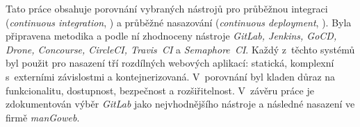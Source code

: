 Tato práce obsahuje porovnání vybraných nástrojů pro průběžnou integraci (\textit{continuous integration}, \CI) a průběžné nasazování (\textit{continuous deployment}, \CD). Byla připravena metodika a podle ní zhodnoceny nástroje \textit{GitLab, Jenkins, GoCD, Drone, Concourse, CircleCI, Travis~CI} a \textit{Semaphore~CI}. Každý z~těchto systémů byl použit pro nasazení tří rozdílných webových aplikací: statická, komplexní s~externími závislostmi a kontejnerizovaná. V~porovnání byl kladen důraz na funkcionalitu, dostupnost, bezpečnost a rozšiřitelnost. V~závěru práce je zdokumentován výběr \textit{GitLab} jako nejvhodnějšího nástroje a následné nasazení \CICD ve firmě \textit{manGoweb}.
